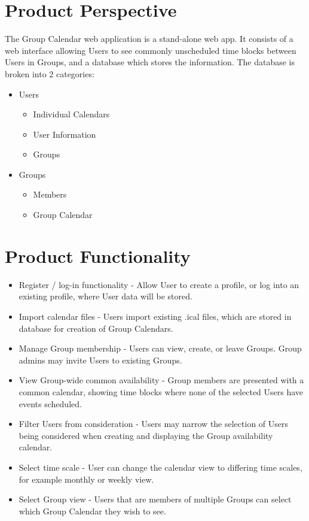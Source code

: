 \documentclass{scrreprt}
\begin{document}
\section{Product Perspective}
The Group Calendar web application is a stand-alone web app. It consists of a
web interface allowing Users to see commonly unscheduled time blocks between
Users in Groups, and a database which stores the information. The database is
broken into 2 categories:
\begin{itemize}
\item Users
	\begin{itemize}
	\item Individual Calendars
	\item User Information
	\item Groups
	\end{itemize}
\item Groups
	\begin{itemize}
	\item Members
	\item Group Calendar
	\end{itemize}
\end{itemize}

\section{Product Functionality}
\begin{itemize}
\item Register / log-in functionality - Allow User to create a profile, or log
into an existing profile, where User data will be stored.
\item Import calendar files - Users import existing .ical files, which are
stored in database for creation of Group Calendars.
\item Manage Group membership - Users can view, create, or leave Groups. Group
admins may invite Users to existing Groups.
\item View Group-wide common availability - Group members are presented with a
common calendar, showing time blocks where none of the selected Users have
events scheduled.
\item Filter Users from consideration - Users may narrow the selection of Users
being considered when creating and displaying the Group availability calendar.
\item Select time scale - User can change the calendar view to differing time 
scales, for example monthly or weekly view.
\item Select Group view - Users that are members of multiple Groups can select
which Group Calendar they wish to see.
\end{itemize}
\end{document}
